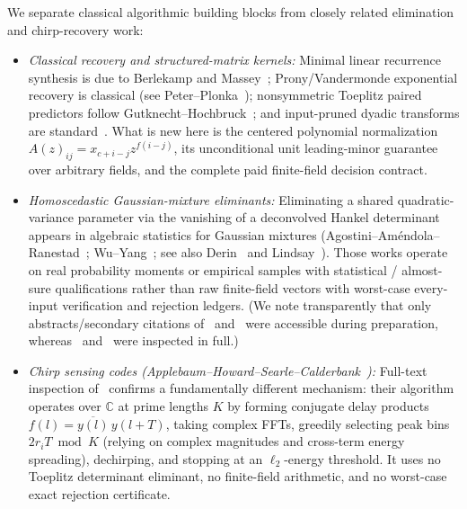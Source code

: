 \documentclass[11pt,reqno]{amsart}
\numberwithin{equation}{section}
\theoremstyle{definition}
\theoremstyle{remark}
\newcommand{\C}{\mathbb{C}}
\begin{document}
We separate classical algorithmic building blocks from closely related elimination and chirp-recovery work:
\begin{itemize}[leftmargin=1.5em]
\item \emph{Classical recovery and structured-matrix kernels:} Minimal linear recurrence synthesis is due to Berlekamp and Massey~\cite{Mas69}; Prony/Vandermonde exponential recovery is classical (see Peter--Plonka~\cite[Theorem~2.1 and Section~5]{PP13}); nonsymmetric Toeplitz paired predictors follow Gutknecht--Hochbruck~\cite[Section~2, Algorithm~1]{GH95}; and input-pruned dyadic transforms are standard~\cite{FFTW}. What is new here is the centered polynomial normalization $A(z)_{ij}=x_{c+i-j}z^{f(i-j)}$, its unconditional unit leading-minor guarantee over arbitrary fields, and the complete paid finite-field decision contract.
\item \emph{Homoscedastic Gaussian-mixture eliminants:} Eliminating a shared quadratic-variance parameter via the vanishing of a deconvolved Hankel determinant appears in algebraic statistics for Gaussian mixtures (Agostini--Am\'endola--Ranestad~\cite[Section~4.3, Eqs.~(79)--(81)]{AAR21}; Wu--Yang~\cite[Section~4.2, Algorithm~3]{WY20}; see also Derin~\cite{Der87} and Lindsay~\cite[Theorem~5B]{Lin89}). Those works operate on real probability moments or empirical samples with statistical / almost-sure qualifications rather than raw finite-field vectors with worst-case every-input verification and rejection ledgers. (We note transparently that only abstracts/secondary citations of~\cite{Der87} and~\cite{Lin89} were accessible during preparation, whereas~\cite{AAR21} and~\cite{WY20} were inspected in full.)
\item \emph{Chirp sensing codes (Applebaum--Howard--Searle--Calderbank~\cite{AHSC09}):} Full-text inspection of~\cite[Sections~3 and~5.2, Eqs.~(5)--(8)]{AHSC09} confirms a fundamentally different mechanism: their algorithm operates over $\C$ at prime lengths $K$ by forming conjugate delay products $f(l)=\overline{y(l)}\,y(l+T)$, taking complex FFTs, greedily selecting peak bins $2r_i T\bmod K$ (relying on complex magnitudes and cross-term energy spreading), dechirping, and stopping at an $\ell_2$-energy threshold. It uses no Toeplitz determinant eliminant, no finite-field arithmetic, and no worst-case exact rejection certificate.
\end{itemize}
\end{document}
